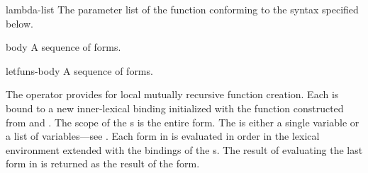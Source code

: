 \begin{optDefinition}
\begin{arguments}
    \item[lambda-list] The parameter list of the function conforming to the
    syntax specified below.

    \item[body] A sequence of forms.

    \item[letfuns-body] A sequence of forms.
\end{arguments}
%
\result%
The  operator provides for local mutually recursive function
creation.  Each  is bound to a new inner-lexical binding
initialized with the function constructed from  and
.  The scope of the s is the entire
 form.  The  is either a single variable or a list
of variables---see .  Each form in  is
evaluated in order in the lexical environment extended with the bindings of the
s.  The result of evaluating the last form in
 is returned as the result of the  form.


\end{optDefinition}
